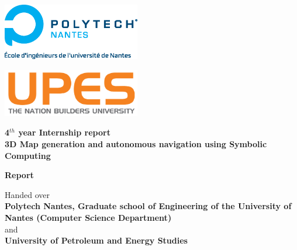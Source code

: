 
\begin{titlepage}	%

\begin{center}


\begin{minipage}[t]{0.48\textwidth}
	\begin{flushleft}
		\includegraphics [width=60mm]{images/logo_ecoles/Polytech_Nantes_Universite} \\[0.5cm]
	\end{flushleft}
\end{minipage}
\begin{minipage}[t]{0.48\textwidth}
	\begin{flushright}
		\includegraphics [width=60mm]{images/upes} \\[0.5cm]
	\end{flushright}
\end{minipage} 

\vfill

\Huge{\textbf{4$^{th}$ year Internship report}} \\
\huge{\textbf{3D Map generation and autonomous navigation using Symbolic Computing}}

\vfill 

\huge{\textbf{Report}} 

\vfill

\Large{Handed over} \\
\LARGE{\textbf{Polytech Nantes, Graduate school of Engineering of the University of Nantes (Computer Science Department)}} \\ 
\Large{and} \\
\LARGE{\textbf{University of Petroleum and Energy Studies}}


\vfill 



\end{center}
\end{titlepage}
